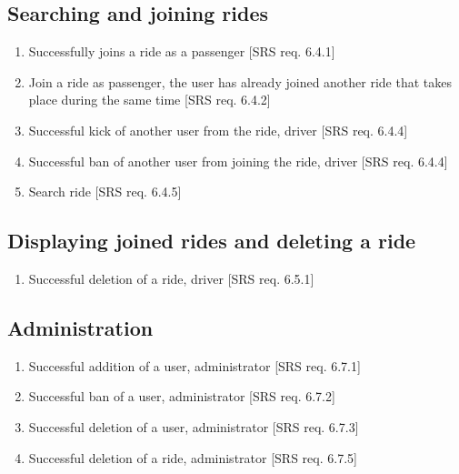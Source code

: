 \documentclass{article}
\begin{document}
\subsection{Searching and joining rides}

\begin{enumerate}[start=1,label={FT4.\arabic* }, leftmargin = 1.1cm, nolistsep]
\item Successfully joins a ride as a passenger [SRS req. 6.4.1]
\item Join a ride as passenger, the user has already joined another ride that takes place during the same time [SRS req. 6.4.2]
\item Successful kick of another user from the ride, driver [SRS req. 6.4.4]
\item Successful ban of another user from joining the ride, driver  [SRS req. 6.4.4]
\item Search ride [SRS req. 6.4.5]
\end{enumerate}

\subsection{Displaying joined rides and deleting a ride}

\begin{enumerate}[start=1,label={FT5.\arabic* }, leftmargin = 1.1cm, nolistsep]
\item Successful deletion of a ride, driver [SRS req. 6.5.1]
\end{enumerate}

\subsection{Administration}

\begin{enumerate}[start=1,label={FT6.\arabic* }, leftmargin = 1.1cm, nolistsep]
\item Successful addition of a user, administrator [SRS req. 6.7.1]
\item Successful ban of a user, administrator [SRS req. 6.7.2]
\item Successful deletion of a user, administrator [SRS req. 6.7.3]
\item Successful deletion of a ride, administrator [SRS req. 6.7.5]\end{enumerate}
\end{document}
